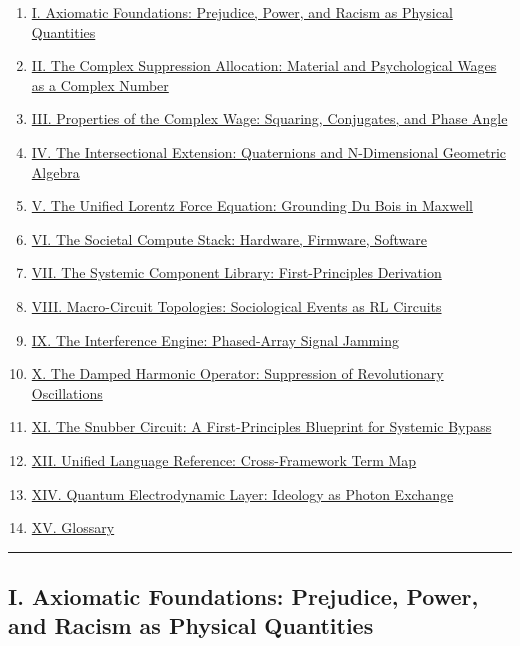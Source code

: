 \begin{enumerate}
\tightlist
\item
  \hyperref[sec-foundations]{I. Axiomatic Foundations: Prejudice, Power,
  and Racism as Physical Quantities}
\item
  \hyperref[sec-complex-wage]{II. The Complex Suppression Allocation:
  Material and Psychological Wages as a Complex Number}
\item
  \hyperref[sec-complex-properties]{III. Properties of the Complex Wage:
  Squaring, Conjugates, and Phase Angle}
\item
  \hyperref[sec-intersectional]{IV. The Intersectional Extension:
  Quaternions and N-Dimensional Geometric Algebra}
\item
  \hyperref[sec-lorentz]{V. The Unified Lorentz Force Equation:
  Grounding Du Bois in Maxwell}
\item
  \hyperref[sec-compute-stack]{VI. The Societal Compute Stack: Hardware,
  Firmware, Software}
\item
  \hyperref[sec-component-library]{VII. The Systemic Component Library:
  First-Principles Derivation}
\item
  \hyperref[sec-circuit-topologies]{VIII. Macro-Circuit Topologies:
  Sociological Events as RL Circuits}
\item
  \hyperref[sec-interference-engine]{IX. The Interference Engine:
  Phased-Array Signal Jamming}
\item
  \hyperref[sec-damped-harmonic]{X. The Damped Harmonic Operator:
  Suppression of Revolutionary Oscillations}
\item
  \hyperref[sec-snubber]{XI. The Snubber Circuit: A First-Principles
  Blueprint for Systemic Bypass}
\item
  \hyperref[sec-unifying-language]{XII. Unified Language Reference:
  Cross-Framework Term Map}
\item
  \hyperref[sec-qed]{XIV. Quantum Electrodynamic Layer: Ideology as
  Photon Exchange}
\item
  \hyperref[sec-glossary]{XV. Glossary}
\end{enumerate}

\begin{center}\rule{0.5\linewidth}{0.5pt}\end{center}

\protect{}\label{sec-foundations}
\subsection{I. Axiomatic Foundations: Prejudice, Power, and Racism as
Physical
Quantities}\label{i.-axiomatic-foundations-prejudice-power-and-racism-as-physical-quantities}

